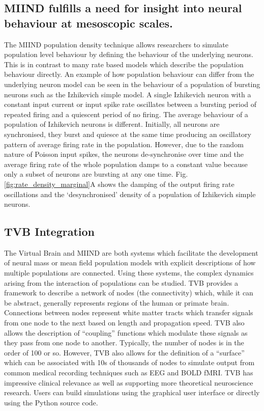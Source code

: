 \documentclass[utf8]{frontiersSCNS} %
\begin{document}
\subsection*{MIIND fulfills a need for insight into neural behaviour at mesoscopic scales.}
The MIIND population density technique allows researchers to simulate population level behaviour by defining the behaviour of the underlying neurons. This is in contrast to many rate based models which describe the population behaviour directly. An example of how population behaviour can differ from the underlying neuron model can be seen in the behaviour of a population of bursting neurons such as the Izhikevich simple model. A single Izhikevich neuron with a constant input current or input spike rate oscillates between a bursting period of repeated firing and a quiescent period of no firing. The average behaviour of a population of Izhikevich neurons is different. Initially, all neurons are synchronised, they burst and quiesce at the same time producing an oscillatory pattern of average firing rate in the population. However, due to the random nature of Poisson input spikes, the neurons de-synchronise over time and the average firing rate of the whole population damps to a constant value because only a subset of neurons are bursting at any one time. Fig. \ref{fig:rate_density_marginal}A shows the damping of the output firing rate oscillations and the `desynchronised' density of a population of Izhikevich simple neurons.

\subsection*{TVB Integration}
\label{tvbintegration}
The Virtual Brain \citep{sanz2013virtual} and MIIND are both systems which facilitate the development of neural mass or mean field population models with explicit descriptions of how multiple populations are connected. Using these systems, the complex dynamics arising from the interaction of populations can be studied.
TVB provides a framework to describe a network of nodes (the connectivity) which, while it can be abstract, generally represents regions of the human or primate brain. Connections between nodes represent white matter tracts which transfer signals from one node to the next based on length and propagation speed. TVB also allows the description of ``coupling'' functions which modulate these signals as they pass from one node to another. Typically, the number of nodes is in the order of 100 or so. However, TVB also allows for the definition of a ``surface'' which can be associated with 10s of thousands of nodes to simulate output from common medical recording techniques such as EEG and BOLD fMRI. TVB has impressive clinical relevance as well as supporting more theoretical neuroscience research. Users can build simulations using the graphical user interface or directly using the Python source code.
\end{document}
